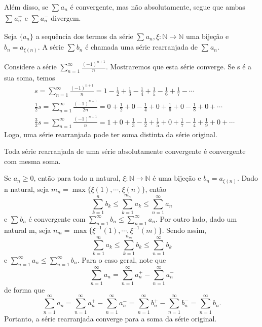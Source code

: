 \documentclass[Analysis/analysis_notes.tex]{subfiles}
\begin{document}
Al\'em disso, se $\sum\limits_{}^{}a_{n}$ \'e convergente, mas n\~ao absolutamente, segue que ambas $\sum\limits_{}^{}a_{n}^{+}$ e $\sum\limits_{}^{}a_{n}^{-}$ divergem.
\begin{def*}
	Seja $\{a_{n}\}$ a sequ\^encia dos termos da s\'erie $\sum\limits_{}^{}a_{n}, \xi:\mathbb{N}\rightarrow \mathbb{N}$
	uma bije\c c\~ao e $b_{n} = a_{\xi(n)}.$ A s\'erie $\sum\limits_{}^{}b_{n}$ \'e chamada uma s\'erie rearranjada de $\sum\limits_{}^{}a_{n}.$
\end{def*}
\begin{example}
	Considere a s\'erie $\sum\limits_{n=1}^{\infty}\frac{(-1)^{n+1}}{n}$. Mostraremos que esta s\'erie converge. Se s \'e a sua soma, temos
	\begin{align*}
		 & s = \sum\limits_{n=1}^{\infty}\frac{(-1)^{n+1}}{n} = 1 - \frac{1}{2} + \frac{1}{3} - \frac{1}{4} + \frac{1}{5} - \frac{1}{6} + \frac{1}{7} -\cdots                 \\
		 & \frac{1}{2}s = \sum\limits_{n=1}^{\infty}\frac{(-1)^{n+1}}{2n} = 0 + \frac{1}{2} + 0 - \frac{1}{4} + 0 + \frac{1}{6} + 0 - \frac{1}{8} + 0 + \cdots                \\
		 & \frac{3}{2}s = \sum\limits_{n=1}^{\infty}\frac{(-1)^{n+1}}{n} = 1 + 0 + \frac{1}{3} - \frac{1}{2} + \frac{1}{5} + 0 + \frac{1}{7}-\frac{1}{4}+\frac{1}{9}+0+\cdots
	\end{align*}
	Logo, uma s\'erie rearranjada pode ter soma distinta da s\'erie original.
\end{example}
\begin{theorem*}
	Toda s\'erie rearranjada de uma s\'erie absolutamente convergente \'e convergente com mesma soma.
\end{theorem*}
\begin{proof*}
	Se $a_{n}\geq{}0$, ent\~ao para todo n natural, $\xi:\mathbb{N}\rightarrow \mathbb{N}$ \'e uma bije\c c\~ao e $b_{n} = a_{\xi(n)}$.
	Dado n natural, seja $m_{n} = \max{\{\xi(1), \cdots, \xi(n)\}}$, ent\~ao
	$$
		\sum\limits_{k=1}^{n}b_{k} \leq{\sum\limits_{k=1}^{m_{n}}a_{k}\leq{\sum\limits_{n=1}^{\infty}a_{n}}}
	$$
	e $\sum\limits_{}^{}b_{n}$ \'e convergente com $\sum\limits_{n=1}^{\infty}b_{n}\leq{\sum\limits_{n=1}^{\infty}a_{n}}$. Por outro lado,
	dado um natural m, seja $n_{m}=\max{\{\xi^{-1}(1), \cdots, \xi^{-1}(m)\}}$. Sendo assim,
	$$
		\sum\limits_{k=1}^{m}a_{k}\leq{\sum\limits_{k=1}^{n_{m}}b_{k}\leq{\sum\limits_{n=1}^{\infty}b_{k}}}
	$$
	e $\sum\limits_{n=1}^{\infty}a_{n}\leq{\sum\limits_{n=1}^{\infty}b_{n}.}$ Para o caso geral, note que
	$$
		\sum\limits_{n=1}^{\infty}a_{n} = \sum\limits_{n=1}^{\infty}a_{n}^{+} - \sum\limits_{n=1}^{\infty}a_{n}^{-}
	$$
	de forma que
	$$
		\sum\limits_{n=1}^{\infty}a_{n} = \sum\limits_{n=1}^{\infty}a_{n}^{+} - \sum\limits_{n=1}^{\infty}a_{n}^{-} = \sum\limits_{n=1}^{\infty}b_{n}^{+}-\sum\limits_{n=1}^{\infty}b_{n}^{-} = \sum\limits_{n=1}^{\infty}b_{n}.
	$$
	Portanto, a s\'erie rearranjada converge para a soma da s\'erie original. \qedsymbol
\end{proof*}
\end{document}
